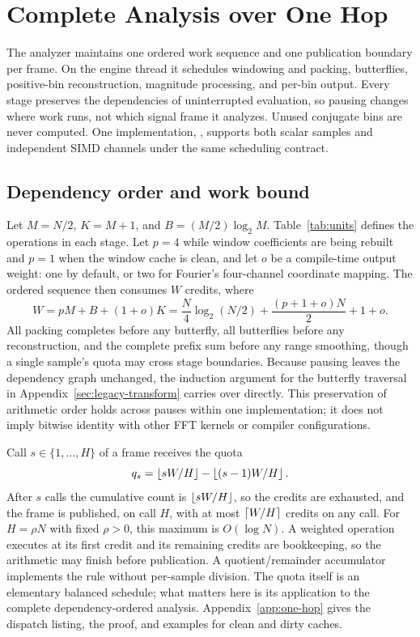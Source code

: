 \section{Complete Analysis over One Hop}
\label{sec:one-hop}
The analyzer maintains one ordered work sequence and one publication boundary
per frame. On the engine thread it schedules windowing and packing,
butterflies, positive-bin reconstruction, magnitude processing, and per-bin
output. Every stage preserves the dependencies of uninterrupted evaluation, so
pausing changes where work runs, not which signal frame it analyzes. Unused
conjugate bins are never computed. One implementation,
, supports both scalar samples and independent SIMD
channels under the same scheduling contract.

\subsection{Dependency order and work bound}
Let $M=N/2$, $K=M+1$, and $B=(M/2)\log_2 M$. Table~\ref{tab:units} defines
the operations in each stage. Let $p=4$ while window coefficients are being
rebuilt and $p=1$ when the window cache is clean, and let $o$ be a
compile-time output weight: one by default, or two for Fourier's four-channel
coordinate mapping. The ordered sequence then consumes $W$ credits, where
\begin{equation}
 W=pM+B+(1+o)K=\frac{N}{4}\log_2(N/2)+\frac{(p+1+o)N}{2}+1+o.
 \label{eq:wholework}
\end{equation}
All packing completes before any butterfly, all butterflies before any
reconstruction, and the complete prefix sum before any range smoothing, though
a single sample's quota may cross stage boundaries. Because pausing leaves the
dependency graph unchanged, the induction argument for the butterfly traversal
in Appendix~\ref{sec:legacy-transform} carries over directly. This
preservation of arithmetic order holds across pauses within one
implementation; it does not imply bitwise identity with other FFT kernels or
compiler configurations.



Call $s\in\{1,\ldots,H\}$ of a frame receives the quota
\begin{equation}
 q_s=\left\lfloor sW/H\right\rfloor-\left\lfloor (s-1)W/H\right\rfloor.
 \label{eq:balanced}
\end{equation}
After $s$ calls the cumulative count is $\left\lfloor sW/H\right\rfloor$, so the credits are
exhausted, and the frame is published, on call $H$, with at most
$\left\lceil W/H\right\rceil$ credits on any call. For $H=\rho N$ with fixed $\rho>0$, this
maximum is $O(\log N)$. A weighted operation executes at its first credit and
its remaining credits are bookkeeping, so the arithmetic may finish before
publication. A quotient/remainder accumulator implements the rule without
per-sample division. The quota itself is an elementary balanced schedule; what
matters here is its application to the complete dependency-ordered analysis.
Appendix~\ref{app:one-hop} gives the dispatch listing, the proof, and examples
for clean and dirty caches.


